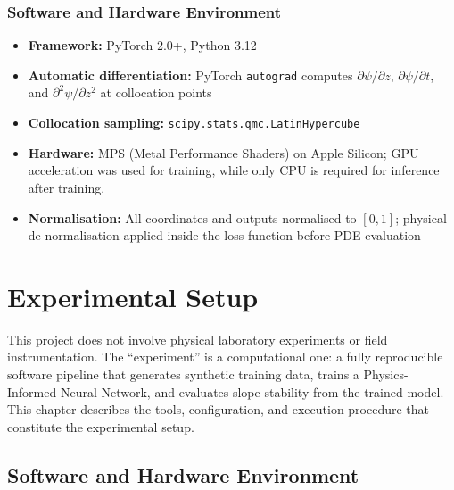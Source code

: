 \documentclass[12pt]{report}
\begin{document}
\subsection{Software and Hardware Environment}

\begin{itemize}
    \item \textbf{Framework:} PyTorch 2.0+, Python 3.12
    \item \textbf{Automatic differentiation:} PyTorch
    \texttt{autograd} computes $\partial\psi/\partial z$,
    $\partial\psi/\partial t$, and $\partial^2\psi/\partial z^2$
    at collocation points
    \item \textbf{Collocation sampling:} \texttt{scipy.stats.qmc.LatinHypercube}
    \item \textbf{Hardware:} MPS (Metal Performance Shaders) on Apple Silicon; GPU acceleration was used for training, while only CPU is required for inference after training.
    \item \textbf{Normalisation:} All coordinates and outputs
    normalised to $[0, 1]$; physical de-normalisation applied
    inside the loss function before PDE evaluation
\end{itemize}
\chapter{Experimental Setup}

This project does not involve physical laboratory experiments or
field instrumentation. The ``experiment'' is a computational one:
a fully reproducible software pipeline that generates synthetic
training data, trains a Physics-Informed Neural Network, and
evaluates slope stability from the trained model. This chapter
describes the tools, configuration, and execution procedure that
constitute the experimental setup.

\section{Software and Hardware Environment}
\end{document}
